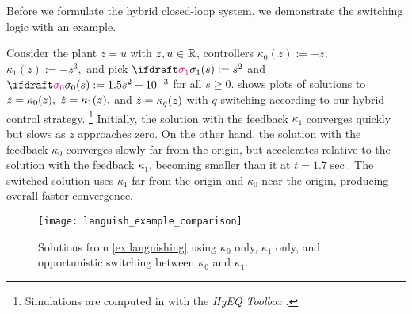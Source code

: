 
Before we formulate the hybrid closed-loop system, 
    we demonstrate the switching logic
    with an example.
\begin{example}
    \label{ex:languishing}
    Consider the plant $\dot z = u$ 
    with $z, u\ {\in}\ \mathbb{R}$, controllers $\kappa_0(z) := -z,$ 
    $\kappa_1(z) := -z^3,$ and pick 
    $\sigmaone(s) := s^2$ and
    $\sigmazero(s) := 1.5 s^2 + 10^{-3}$
    for all $s \geq 0.$
     shows
    plots of solutions to $\dot{z} = \kappa_0(z),$ 
    $\dot{z} = \kappa_1(z),$ and
    $\dot{z} = \kappa_q(z)$ with $q$ switching 
    according to our hybrid control strategy.%
    \footnote{Simulations are computed in \Matlab 
    with the \emph{HyEQ Toolbox} \cite{sanfelice_toolbox_2013}.} 
    Initially, the solution with the feedback $\kappa_1$ converges quickly 
    but slows as $z$ approaches zero.
    On the other hand, the solution with the feedback $\kappa_0$
    converges slowly far from the origin, 
    but accelerates relative to the solution with the feedback $\kappa_1$,
    becoming smaller than it at $t=1.7 \sec$.
    The switched solution uses 
    $\kappa_1$ far from the origin and 
    $\kappa_0$ near the origin, 
    producing overall faster convergence.
    \begin{figure}[htbp]
        \centering
        \texttt{[image: languish\_example\_comparison]}
        \setlength{\belowcaptionskip}{-10pt}
        \caption{Solutions from \cref{ex:languishing} 
        using $\kappa_0$ only, $\kappa_1$ only, 
        and opportunistic switching between
        $\kappa_0$ and $\kappa_1$.}
        \label{fig:languishing example comparison}
    \end{figure}


\end{example}
